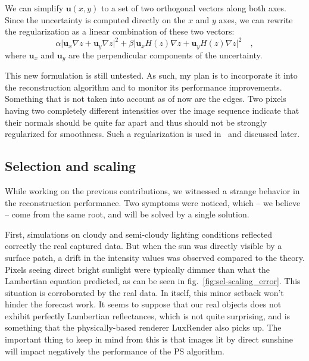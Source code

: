 We can simplify $\mathbf{u}(x,y)$ to a set of two orthogonal vectors along both axes. Since the uncertainty is computed directly on the $x$ and $y$ axes, we can rewrite the regularization as a linear combination of these two vectors:
\begin{equation}
\alpha \lvert \mathbf{u}_x \nabla z + \mathbf{u}_y \nabla z\rvert ^2 +
\beta \lvert \mathbf{u}_x H(z)\nabla z + \mathbf{u}_y H(z)\nabla z\rvert ^2
\quad,
\end{equation}
where $\mathbf{u}_x$ and $\mathbf{u}_y$ are the perpendicular components of the uncertainty.

This new formulation is still untested. As such, my plan is to incorporate it into the reconstruction algorithm and to monitor its performance improvements. Something that is not taken into account as of now are the edges. Two pixels having two completely different intensities over the image sequence indicate that their normals should be quite far apart and thus should not be strongly regularized for smoothness. Such a regularization is used in~\cite{jung-cvpr-15} and discussed later.


\subsection{Selection and scaling}
While working on the previous contributions, we witnessed a strange behavior in the reconstruction performance. Two symptoms were noticed, which -- we believe -- come from the same root, and will be solved by a single solution.

First, simulations on cloudy and semi-cloudy lighting conditions reflected correctly the real captured data. But when the sun was directly visible by a surface patch, a drift in the intensity values was observed compared to the theory. Pixels seeing direct bright sunlight were typically dimmer than what the Lambertian equation predicted, as can be seen in fig.~\ref{fig:sel-scaling_error}. This situation is corroborated by the real data. In itself, this minor setback won't hinder the forecast work. It seems to suppose that our real objects does not exhibit perfectly Lambertian reflectances, which is not quite surprising, and is something that the physically-based renderer LuxRender also picks up. The important thing to keep in mind from this is that images lit by direct sunshine will impact negatively the performance of the PS algorithm.

